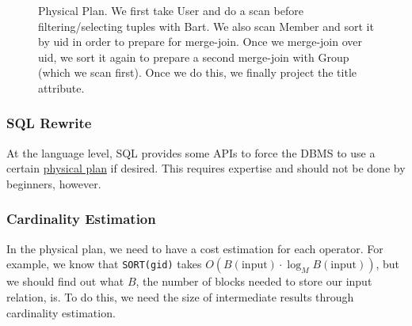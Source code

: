 \begin{example}
      \begin{figure}[H]
        \centering 
        \caption{Physical Plan. We first take User and do a scan before filtering/selecting tuples with Bart. We also scan Member and sort it by uid in order to prepare for merge-join. Once we merge-join over uid, we sort it again to prepare a second merge-join with Group (which we scan first). Once we do this, we finally project the title attribute. } 
        \label{fig:physical_plan}
      \end{figure}
    \end{example} 

  \subsubsection{SQL Rewrite}

    At the language level, SQL provides some APIs to force the DBMS to use a certain \hyperref[def:physical-plan]{physical plan} if desired. This requires expertise and should not be done by beginners, however. 

  \subsubsection{Cardinality Estimation}

    In the physical plan, we need to have a cost estimation for each operator. For example, we know that \texttt{SORT(gid)} takes $O(B(\text{input}) \cdot \log_M B(\text{input}))$, but we should find out what $B$, the number of blocks needed to store our input relation, is. To do this, we need the size of intermediate results through cardinality estimation.  

